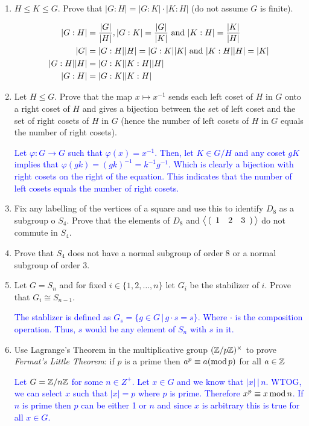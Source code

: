 \documentclass[10pt,a4paper]{report}
\newcommand{\BLUE}[1]{\textcolor{blue}{#1}}
\begin{document}
\begin{enumerate}
	\item $H \le K\le G$.  Prove that $|G:H|=|G:K|\cdot|K:H|$ (do not assume $G$ is finite).
	
	\BLUE{\begin{align*}
		|G:H|&=\frac{|G|}{|H|}, |G:K|=\frac{|G|}{|K|} \text{ and } 	|K:H|= \frac{|K|}{|H|} \\
		|G| &= |G:H||H| = |G:K||K| \text{ and } |K:H||H|=|K|\\
		|G:H||H| &= |G:K||K:H||H| \\
		|G:H| &= |G:K||K:H|
	\end{align*}
	}
	
	\item Let $H \le G$.  Prove that the map $x\mapsto x^{-1}$ sends each left coset of $H$ in $G$ onto a right coset of $H$ and gives a bijection between the set of left coset and the set of right cosets of $H$ in $G$ (hence the number of left cosets of $H$ in $G$ equals the number of right cosets).
	
	\BLUE{Let $\varphi : G \to G$ such that $\varphi(x)=x^{-1}$.  Then, let $K \in G/H$ and any coset $gK$ implies that $\varphi(gk)= (gk)^{-1}= k^{-1}g^{-1}$.  Which is clearly a bijection with right cosets on the right of the equation.  This indicates that the number of left cosets equals the number of right cosets.
	}
	
	\item Fix any labelling of the vertices of a square and use this to identify $D_8$ as a subgroup o $S_4$.  Prove that the elements of $D_8$ and $\left \langle\, (\begin{array}{cccccccccc} 1&2&3 \end{array}) \,\right \rangle$ do not commute in $S_4$.
	
	\item Prove that $S_4$ does not have a normal subgroup of order 8 or a normal subgroup of order 3.
	
	\item Let $G=S_n$ and for fixed $i\in \{1,2,\dots,n\}$ let $G_i$ be the stabilizer of $i$.  Prove that $G_i \cong S_{n-1}$.
	
	\BLUE{The stablizer is defined as $G_s=\{g\in G\,|\, g\cdot s=s\}$. Where $\cdot$ is the composition operation. Thus, $s$ would be any element of $S_n$ with $s$ in it. 
	}
	
	\item Use Lagrange's Theorem in the multiplicative group $(\mathbb{Z}/p\mathbb{Z})^\times$ to prove \textit{Fermat's Little Theorem}: if $p$ is a prime then $a^p\equiv a(\operatorname{mod}{p})$ for all $a \in \mathbb{Z}$
	
	\BLUE{Let $G=\mathbb{Z}/n\mathbb{Z}$ for some $n \in Z^+$.  Let $x\in G$ and we know that $|x|\,|\, n$.  WTOG, we can select $x$ such that $|x|=p$ where $p$ is prime.  Therefore $x^p \equiv x\operatorname{mod}{n}$. If $n$ is prime then $p$ can be either 1 or $n$ and since $x$ is arbitrary this is true for all $x \in G$.
	}
	

\end{enumerate}
\end{document}
